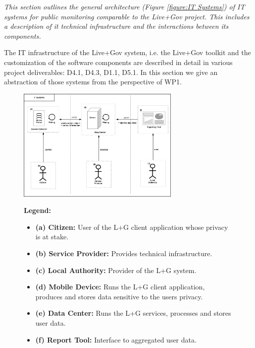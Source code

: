 \documentclass[runningheads,a4paper]{llncs}
\newenvironment{LGContent}
{ \par\color{blue} \it \small }
{ \par }
\begin{document}
\begin{LGContent}
This section outlines the general architecture (Figure \ref{figure:IT Systems}) of IT systems for public monitoring comparable to the Live+Gov project.
This includes a description of it technical infrastructure and the interactions between its components.

The IT infrastructure of the Live+Gov system, i.e. the Live+Gov toolkit and the customization of the software components are described in detail in various project deliverables: D4.1, D4.3, D1.1, D5.1.
In this section we give an abstraction of those systems from the perspective of WP1.

\begin{figure}[h]
\centering
\includegraphics[width=0.7\textwidth]{diagrams/png/it-systems.png}

\begin{flushleft}
\scriptsize
\textbf{Legend:}
\begin{itemize}
\itemsep1pt\parskip0pt

\item
\textbf{(a) Citizen:} 
User of the L+G client application whose privacy is at stake.

\item
\textbf{(b) Service Provider:} Provides technical infrastructure.

\item
\textbf{(c) Local Authority:} Provider of the L+G system.

\item
\textbf{(d) Mobile Device:}
Runs the L+G client application, produces and stores data sensitive to the users privacy.

\item
\textbf{(e) Data Center:} Runs the L+G services, processes and stores user data.

\item
\textbf{(f) Report Tool:} Interface to aggregated user data.


\end{itemize}
\end{flushleft}
\end{figure}
\end{LGContent}
\end{document}
